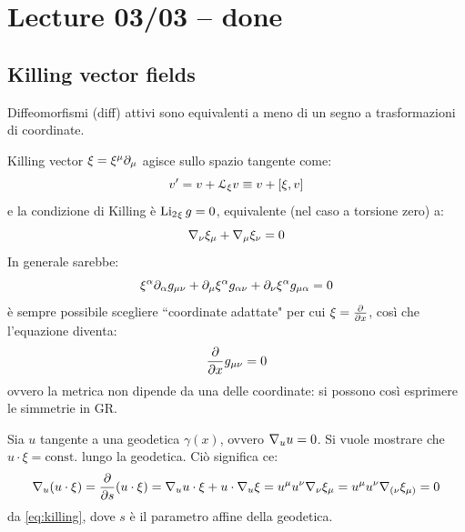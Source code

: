 
\chapter{Lecture 03/03 -- done}

\section{Killing vector fields}

Diffeomorfismi (diff) attivi sono equivalenti a meno di un segno a trasformazioni di coordinate.

Killing vector $ \xi = \xi^\mu \partial_\mu $ agisce sullo spazio tangente come:
\begin{equation*}
  v' = v + \EuScript{L}_\xi v \equiv v + [\xi , v]
\end{equation*}
e la condizione di Killing è $ \operatorname{Li_2}_\xi g = 0 $, equivalente (nel caso a torsione zero) a:
\begin{equation}
  \nabla_\nu \xi_\mu + \nabla_\mu \xi_\nu = 0
  \label{eq:killing}
\end{equation}
In generale sarebbe:
\begin{equation}
  \xi^\alpha \partial_\alpha g_{\mu \nu} + \partial_\mu \xi^\alpha g_{\alpha \nu} + \partial_\nu \xi^\alpha g_{\mu \alpha} = 0
\end{equation}
è sempre possibile scegliere ``coordinate adattate" per cui $ \xi = \frac{\partial}{\partial x} $, così che l'equazione diventa:
\begin{equation}
  \frac{\partial}{\partial x} g_{\mu \nu} = 0
\end{equation}
ovvero la metrica non dipende da una delle coordinate: si possono così esprimere le simmetrie in GR.

\begin{example}{}{}
  Sia $ u $ tangente a una geodetica $ \gamma(x) $, ovvero $ \nabla_u u = 0 $. Si vuole mostrare che $ u \cdot \xi = \text{const.} $ lungo la geodetica. Ciò significa ce:
  \begin{equation*}
    \nabla_u (u \cdot \xi) = \frac{\partial}{\partial s} (u \cdot \xi) = \nabla_u u \cdot \xi + u \cdot \nabla_u \xi = u^\mu u^\nu \nabla_\nu \xi_\mu = u^\mu u^\nu \nabla_{(\nu} \xi_{\mu)} = 0
  \end{equation*}
  da \ref{eq:killing}, dove $ s $ è il parametro affine della geodetica.
\end{example}


